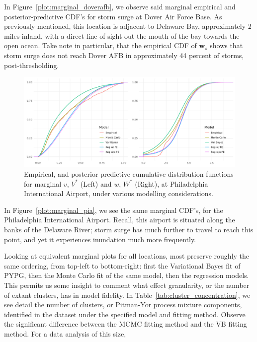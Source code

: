 In Figure~\ref{plot:marginal_doverafb}, we observe said marginal empirical and posterior-predictive
    CDF's for storm surge at Dover Air Force Base.  As previously mentioned, this location is adjacent
    to Delaware Bay, approximately 2 miles inland, with a direct line of sight out the mouth of the
    bay towards the open ocean.  Take note in particular, that the empirical CDF of $\bm{w}_s$ shows
    that storm surge does not reach Dover AFB in approximately \num{44} percent of storms, 
    post-thresholding.

\begin{figure}[ht]
    \caption{Empirical, and posterior predictive cumulative distribution functions for marginal 
    $v$, $V^*$ (Left) and $w$, $W^*$ (Right), at Philadelphia International Airport, under 
    various modelling considerations.\label{Plot:marginal_pia}}
    \centering
    \includegraphics[width=\textwidth]{./plots/delaware_marginal_phil_ia.png}
\end{figure}

In Figure~\ref{plot:marginal_pia}, we see the same marginal CDF's, for the Philadelphia International
    Airport.  Recall, this airport is situated along the banks of the Delaware River; storm surge
    has much further to travel to reach this point, and yet it experiences inundation much more 
    frequently.



Looking at equivalent marginal plots for all locations, most preserve roughly the
    same ordering, from top-left to bottom-right: first the Variational Bayes fit of PYPG, then the 
    Monte Carlo fit of the same model, then the regression models.  This permits us some insight 
    to comment what effect granularity, or the number of extant clusters, has in model fidelity.
    In Table~\ref{tab:cluster_concentration}, we see detail the number of clusters, or Pitman-Yor
    process mixture components, identified in the dataset under the specified model and fitting 
    method.  Observe the significant difference between the MCMC fitting method and the VB fitting
    method.  For a data analysis of this size, 






    




